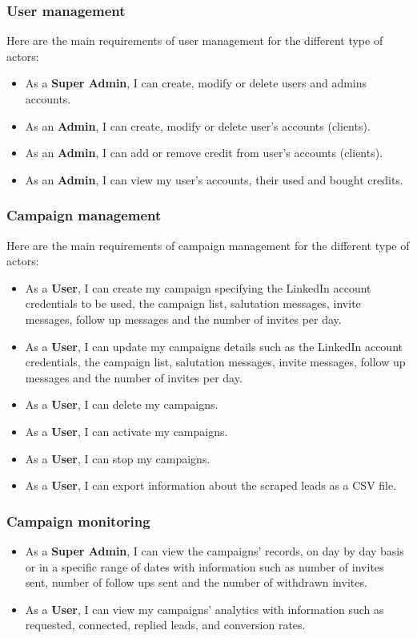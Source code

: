 \subsubsection{User management}
Here are the main requirements of user management for the different type of actors:
\begin{itemize}
	\item As a \textbf{Super Admin}, I can create, modify or delete users and admins accounts.
	\item As an \textbf{Admin}, I can create, modify or delete user's accounts (clients).
	\item As an \textbf{Admin}, I can add or remove credit from user's accounts (clients).
	\item As an \textbf{Admin}, I can view my user's accounts, their used and bought credits.
\end{itemize}

\subsubsection{Campaign management}
Here are the main requirements of campaign management for the different type of actors:
\begin{itemize}
	\item As a \textbf{User}, I can create my campaign specifying the LinkedIn account credentials to be used, the campaign list, salutation messages, invite messages, follow up messages and the number of invites per day.
	\item As a \textbf{User}, I can update my campaigns details such as the LinkedIn account credentials, the campaign list, salutation messages, invite messages, follow up messages and the number of invites per day.
	\item As a \textbf{User}, I can delete my campaigns.
	\item As a \textbf{User}, I can activate my campaigns.
	\item As a \textbf{User}, I can stop my campaigns.
	\item As a \textbf{User}, I can export information about the scraped leads as a CSV file.
\end{itemize}

\subsubsection{Campaign monitoring}
\begin{itemize}
	\item As a \textbf{Super Admin}, I can view the campaigns' records, on day by day basis or in a specific range of dates with information such as number of invites sent, number of follow ups sent and the number of withdrawn invites.
	\item As a \textbf{User}, I can view my campaigns' analytics with information such as requested, connected, replied leads, and conversion rates.
\end{itemize}

